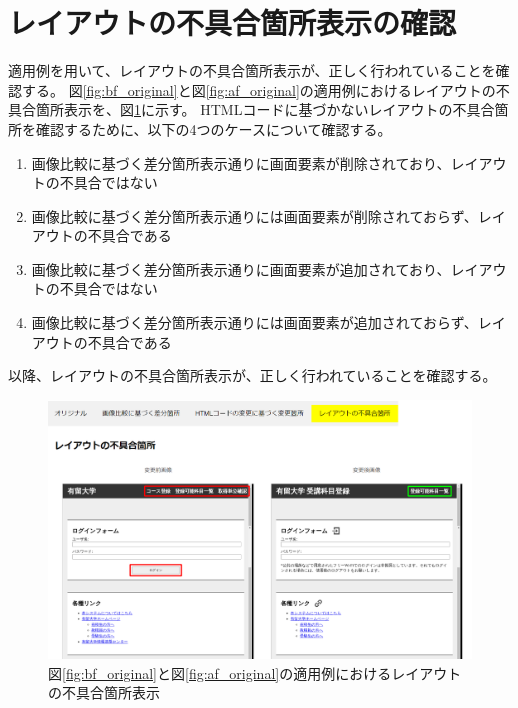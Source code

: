 \section{レイアウトの不具合箇所表示の確認}
適用例を用いて、レイアウトの不具合箇所表示が、正しく行われていることを確認する。
図\ref{fig:bf_original}と図\ref{fig:af_original}の適用例におけるレイアウトの不具合箇所表示を、図\ref{fig: 5_app3}に示す。
HTMLコードに基づかないレイアウトの不具合箇所を確認するために、以下の4つのケースについて確認する。
\begin{enumerate}[label=ケース\arabic*., leftmargin=1.8cm]
    \item 画像比較に基づく差分箇所表示通りに画面要素が削除されており、レイアウトの不具合ではない
    \item 画像比較に基づく差分箇所表示通りには画面要素が削除されておらず、レイアウトの不具合である
    \item 画像比較に基づく差分箇所表示通りに画面要素が追加されており、レイアウトの不具合ではない
    \item 画像比較に基づく差分箇所表示通りには画面要素が追加されておらず、レイアウトの不具合である
\end{enumerate}
以降、レイアウトの不具合箇所表示が、正しく行われていることを確認する。
\begin{figure}[tp]
    \begin{center}
        \includegraphics[width=1.0\columnwidth]{image/5/new_effect.png}
        \caption{図\ref{fig:bf_original}と図\ref{fig:af_original}の適用例におけるレイアウトの不具合箇所表示}
        \label{fig: 5_app3}
    \end{center}
\end{figure}


